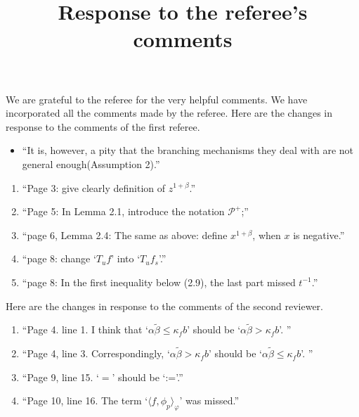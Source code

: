 \documentclass[12pt,a4paper]{amsart}
\title[Response]{\large Response to the referee's comments}
\begin{document}
	\maketitle	
	We are grateful to the referee for the very helpful comments.
	We have incorporated all the comments made by the referee.
	Here are the changes in response to the comments of the first referee.
	
	\begin{itemize}
		\item ``It is, however, a pity that the branching mechanisms they deal with are not general enough(Assumption 2).''
		
	\end{itemize}
\begin{enumerate}
	\item ``Page 3: give clearly definition of $z^{1+\beta}$.''
	
	\item ``Page 5: In Lemma 2.1, introduce the notation $\mathcal P^+$;''
	
	\item ``page 6, Lemma 2.4: The same as above: define $x^{1+\beta}$, when $x$ is negative.''
	
	\item ``page 8: change `$T_uf$' into `$T_uf_s$'.''
	
	\item ``page 8: In the first inequality below (2.9), the last part missed $t^{-1}$.''
	
\end{enumerate}
	Here are the changes in response to the comments of the second reviewer.
	\begin{enumerate}
		\item ``Page 4. line 1. I think that `$\alpha \widetilde \beta \leq \kappa_f b$' should be `$\alpha \tilde \beta > \kappa_f b$'. ''
		
		\item ``Page 4, line 3. Correspondingly, `$\alpha \tilde \beta > \kappa_f b$' should be `$\alpha \tilde \beta \leq \kappa_f b$'. ''
		
		\item ``Page 9, line 15. `$=$' should be `:='.''
		
		\item ``Page 10, line 16. The term `$\langle f, \phi_p\rangle_{\varphi}$' was missed.''
	
	\end{enumerate}
\end{document}
